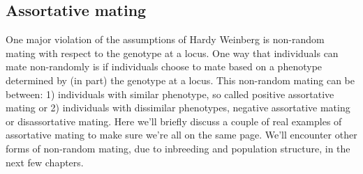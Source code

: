 




\subsection{Assortative mating}
One major violation of the assumptions of Hardy Weinberg is
non-random mating with respect to the genotype at a locus. One way
that individuals can mate non-randomly is if individuals choose to mate
based on a phenotype determined by (in part) the genotype at a
locus. This non-random mating can be between:
1) individuals with similar phenotype, so called positive assortative
mating or 2) individuals with dissimilar phenotypes, negative assortative mating or disassortative
mating. Here we'll briefly discuss a couple of real examples of
assortative mating to make sure we're all on the same page. 
We'll encounter other forms of non-random mating, due to inbreeding
and population structure, in the next few chapters. 





